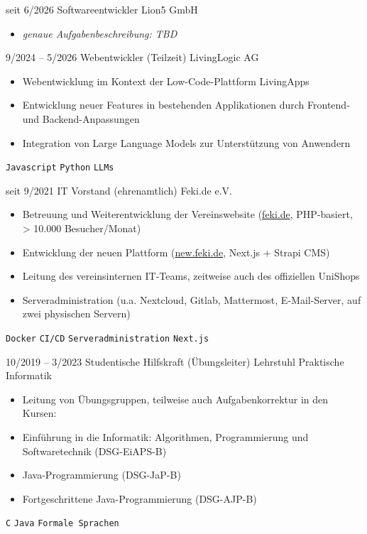 \documentclass[9pt]{developercv} %
\begin{document}
\begin{entrylist}
	\entry
	{seit 6/2026}
	{Softwareentwickler}
	{Lion5 GmbH}
	{\vspace{-10pt}
		\begin{itemize}[noitemsep,topsep=1pt,parsep=1pt,partopsep=0pt, leftmargin=-1pt]
			\item \textit{genaue Aufgabenbeschreibung: TBD}
		\end{itemize}}
	\entry
	{9/2024 -- 5/2026}
	{Webentwickler (Teilzeit)}
	{LivingLogic AG}
	{\vspace{-10pt}
		\begin{itemize}[noitemsep,topsep=1pt,parsep=1pt,partopsep=0pt, leftmargin=-1pt]
			\item Webentwicklung im Kontext der Low-Code-Plattform LivingApps
			\item Entwicklung neuer Features in bestehenden Applikationen durch Frontend- und Backend-Anpassungen
			\item Integration von Large Language Models zur Unterstützung von Anwendern
		\end{itemize}
		\texttt{Javascript} \slashsep \texttt{Python} \slashsep \texttt{LLMs}}
	\entry
	{seit 9/2021}
	{IT Vorstand (ehrenamtlich)}
	{Feki.de e.V.}
	{\vspace{-10pt}
		\begin{itemize}[noitemsep,topsep=1pt,parsep=1pt,partopsep=0pt, leftmargin=-1pt]
			\item Betreuung und Weiterentwicklung der Vereinswebsite (\href{https://feki.de}{feki.de}, PHP-basiert, > 10.000 Besucher/Monat)
			\item Entwicklung der neuen Plattform (\href{https://new.feki.de}{new.feki.de}, Next.js + Strapi CMS)
			\item Leitung des vereinsinternen IT-Teams, zeitweise auch des offiziellen UniShops
			\item Serveradministration (u.a. Nextcloud, Gitlab, Mattermost, E-Mail-Server, auf zwei physischen Servern)
		\end{itemize}
		\texttt{Docker} \slashsep \texttt{CI/CD} \slashsep \texttt{Serveradministration} \slashsep \texttt{Next.js}}
	\entry
	{10/2019 -- 3/2023}
	{Studentische Hilfskraft (Übungsleiter)}
	{Lehrstuhl Praktische Informatik}
	{\vspace{-10pt}
		\begin{itemize}[noitemsep,topsep=1pt,parsep=1pt,partopsep=0pt, leftmargin=-1pt]
			\item Leitung von Übungsgruppen, teilweise auch Aufgabenkorrektur in den Kursen:
			\item Einführung in die Informatik: Algorithmen, Programmierung und Softwaretechnik (DSG-EiAPS-B)
			\item Java-Programmierung (DSG-JaP-B)
			\item Fortgeschrittene Java-Programmierung (DSG-AJP-B)
		\end{itemize}
		\texttt{C} \slashsep \texttt{Java} \slashsep \texttt{Formale Sprachen}}
\end{entrylist}
\end{document}
